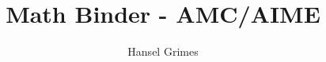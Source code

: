 

\title{\textbf{Math Binder - AMC/AIME}}
\author{Hansel Grimes}


  \maketitle

  \tableofcontents

  \newpage

  

